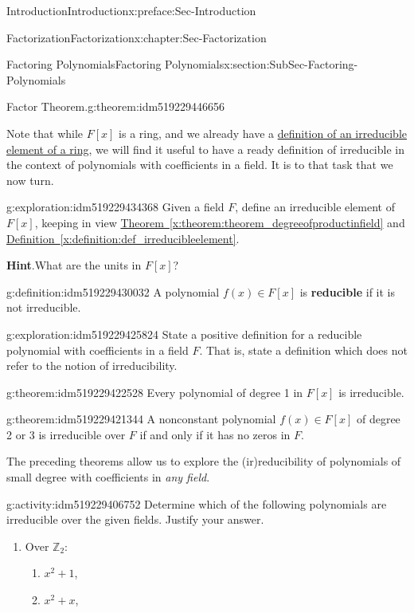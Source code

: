 \documentclass[oneside,10pt,]{book}
\newcommand{\blocktitlefont}{\relax}
\newcommand{\xreffont}{\relax}
\newcommand{\terminology}[1]{\textbf{#1}}
\numberwithin{equation}{section}
\def\Z{{\mathbb Z}}
\begin{document}
\begin{preface}{Introduction}{}{Introduction}{}{}{x:preface:Sec-Introduction}
\begin{chapterptx}{Factorization}{}{Factorization}{}{}{x:chapter:Sec-Factorization}
\begin{sectionptx}{Factoring Polynomials}{}{Factoring Polynomials}{}{}{x:section:SubSec-Factoring-Polynomials}
\begin{theorem}{Factor Theorem.}{}{g:theorem:idm519229446656}
\end{theorem}
Note that while \(F[x]\) is a ring, and we already have a \hyperref[x:definition:def_irreducibleelement]{definition of an irreducible element of a ring}, we will find it useful to have a ready definition of irreducible in the context of polynomials with coefficients in a field. It is to that task that we now turn.%
\begin{exploration}{}{g:exploration:idm519229434368}%
Given a field \(F\), define an irreducible element of \(F[x]\), keeping in view \hyperref[x:theorem:theorem_degreeofproductinfield]{Theorem~{\xreffont\ref{x:theorem:theorem_degreeofproductinfield}}} and \hyperref[x:definition:def_irreducibleelement]{Definition~{\xreffont\ref{x:definition:def_irreducibleelement}}}. 

\textbf{\blocktitlefont Hint}.\quad{}What are the units in \(F[x]\)?%
\end{exploration}
\begin{definition}{}{g:definition:idm519229430032}%
%
A polynomial \(f(x)\in F[x]\) is \terminology{reducible} if it is not irreducible.%
\end{definition}
\begin{exploration}{}{g:exploration:idm519229425824}%
State a positive definition for a reducible polynomial with coefficients in a field \(F\). That is, state a definition which does not refer to the notion of irreducibility.%
\end{exploration}
\begin{theorem}{}{}{g:theorem:idm519229422528}%
Every polynomial of degree 1 in \(F[x]\) is irreducible.%
\end{theorem}
\begin{theorem}{}{}{g:theorem:idm519229421344}%
A nonconstant polynomial \(f(x)\in F[x]\) of degree 2 or 3 is irreducible over \(F\) if and only if it has no zeros in \(F\).%
\end{theorem}
The preceding theorems allow us to explore the (ir)reducibility of polynomials of small degree with coefficients in \emph{any field}.%
\begin{activity}{}{g:activity:idm519229406752}%
Determine which of the following polynomials are irreducible over the given fields. Justify your answer.%
%
\begin{enumerate}
\item{}Over \(\Z_2\):%
%
\begin{enumerate}
\item{}\(x^2 + 1\),%
\item{}\(x^2 + x\),%

\end{enumerate}
\end{enumerate}
\end{activity}
\end{sectionptx}
\end{chapterptx}
\end{preface}
\end{document}
